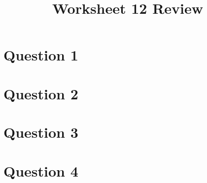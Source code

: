 \documentclass[12pt]{article}
\begin{document}
\title{Worksheet 12 Review}
\maketitle

\section*{Question 1}

\section*{Question 2}

\section*{Question 3}

\section*{Question 4}
\end{document}
